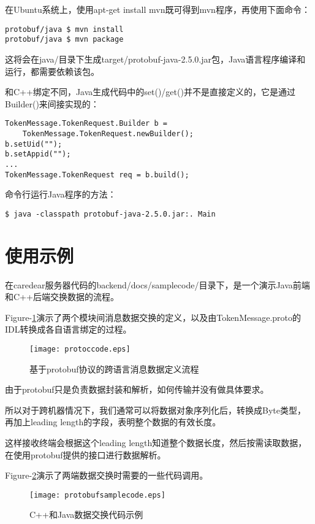 \documentclass[a4paper]{article}
\begin{document}
在Ubuntu系统上，使用apt-get install mvn既可得到mvn程序，再使用下面命令：

\begin{lstlisting}
protobuf/java $ mvn install
protobuf/java $ mvn package
\end{lstlisting}

这将会在java/目录下生成target/protobuf-java-2.5.0.jar包，Java语言程序编译和运行，都需要依赖该包。

和C++绑定不同，Java生成代码中的set()/get()并不是直接定义的，它是通过Builder()来间接实现的：
\begin{lstlisting}
TokenMessage.TokenRequest.Builder b =
    TokenMessage.TokenRequest.newBuilder();
b.setUid("");
b.setAppid("");
...
TokenMessage.TokenRequest req = b.build();
\end{lstlisting}

命令行运行Java程序的方法：
\begin{lstlisting}[frame=none]
$ java -classpath protobuf-java-2.5.0.jar:. Main
\end{lstlisting}


\section{使用示例}
在caredear服务器代码的backend/docs/samplecode/目录下，是一个演示Java前端和C++后端交换数据的流程。

Figure-\ref{figProtocCode}演示了两个模块间消息数据交换的定义，以及由TokenMessage.proto的IDL转换成各自语言绑定的过程。

\begin{figure}
\caption{基于protobuf协议的跨语言消息数据定义流程}\label{figProtocCode}
\centering
\texttt{[image: protoccode.eps]}
\end{figure}

由于protobuf只是负责数据封装和解析，如何传输并没有做具体要求。

所以对于跨机器情况下，我们通常可以将数据对象序列化后，转换成Byte类型，再加上leading length的字段，表明整个数据的有效长度。

这样接收终端会根据这个leading length知道整个数据长度，然后按需读取数据，在使用protobuf提供的接口进行数据解析。

Figure-\ref{figProtocCodeJandC}演示了两端数据交换时需要的一些代码调用。

\begin{figure}
\caption{C++和Java数据交换代码示例}\label{figProtocCodeJandC}
\centering
\texttt{[image: protobufsamplecode.eps]}
\end{figure}
\end{document}
